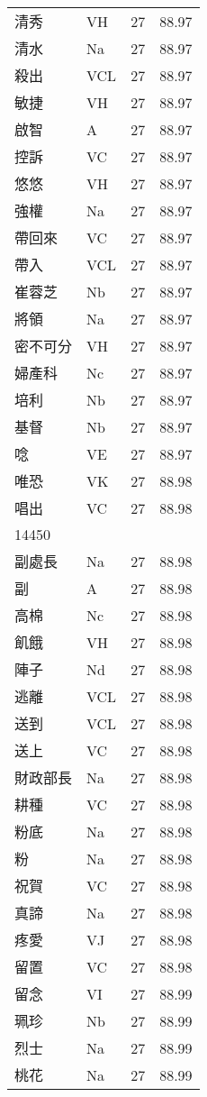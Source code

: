 \documentclass[twocolumn]{book}
\begin{document}
\begin{supertabular}{llrr}
清秀 & VH & 27 &  88.97\\
清水 & Na & 27 &  88.97\\
殺出 & VCL & 27 &  88.97\\
敏捷 & VH & 27 &  88.97\\
啟智 & A & 27 &  88.97\\
控訴 & VC & 27 &  88.97\\
悠悠 & VH & 27 &  88.97\\
強權 & Na & 27 &  88.97\\
帶回來 & VC & 27 &  88.97\\
帶入 & VCL & 27 &  88.97\\
崔蓉芝 & Nb & 27 &  88.97\\
將領 & Na & 27 &  88.97\\
密不可分 & VH & 27 &  88.97\\
婦產科 & Nc & 27 &  88.97\\
培利 & Nb & 27 &  88.97\\
基督 & Nb & 27 &  88.97\\
唸 & VE & 27 &  88.97\\
唯恐 & VK & 27 &  88.98\\
唱出 & VC & 27 &  88.98\\
14450\\
副處長 & Na & 27 &  88.98\\
副 & A & 27 &  88.98\\
高棉 & Nc & 27 &  88.98\\
飢餓 & VH & 27 &  88.98\\
陣子 & Nd & 27 &  88.98\\
逃離 & VCL & 27 &  88.98\\
送到 & VCL & 27 &  88.98\\
送上 & VC & 27 &  88.98\\
財政部長 & Na & 27 &  88.98\\
耕種 & VC & 27 &  88.98\\
粉底 & Na & 27 &  88.98\\
粉 & Na & 27 &  88.98\\
祝賀 & VC & 27 &  88.98\\
真諦 & Na & 27 &  88.98\\
疼愛 & VJ & 27 &  88.98\\
留置 & VC & 27 &  88.98\\
留念 & VI & 27 &  88.99\\
珮珍 & Nb & 27 &  88.99\\
烈士 & Na & 27 &  88.99\\
桃花 & Na & 27 &  88.99\\

\end{supertabular}
\end{document}
